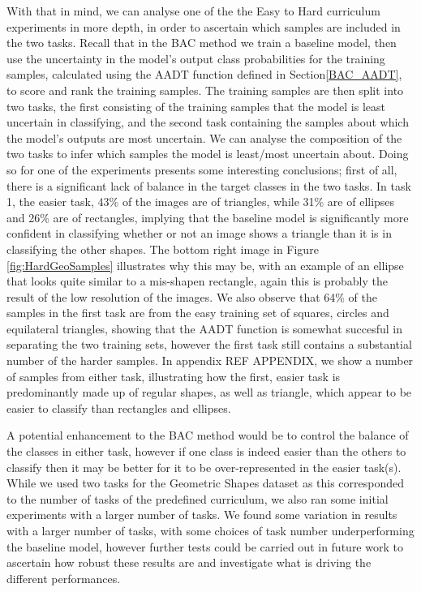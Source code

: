 With that in mind, we can analyse one of the the Easy to Hard curriculum experiments in more depth, in order to ascertain which samples are included in the two tasks. Recall that in the BAC method we train a baseline model, then use the uncertainty in the model's output class probabilities for the training samples, calculated using the AADT function defined in Section\ref{BAC_AADT}, to score and rank the training samples. The training samples are then split into two tasks, the first consisting of the training samples that the model is least uncertain in classifying, and the second task containing the samples about which the model's outputs are most uncertain. We can analyse the composition of the two tasks to infer which samples the model is least/most uncertain about. Doing so for one of the experiments presents some interesting conclusions; first of all, there is a significant lack of balance in the target classes in the two tasks. In task 1, the easier task, 43\% of the images are of triangles, while 31\% are of ellipses and 26\% are of rectangles, implying that the baseline model is significantly more confident in classifying whether or not an image shows a triangle than it is in classifying the other shapes. The bottom right image in Figure \ref{fig:HardGeoSamples} illustrates why this may be, with an example of an ellipse that looks quite similar to a mis-shapen rectangle, again this is probably the result of the low resolution of the images. We also observe that 64\% of the samples in the first task are from the easy training set of squares, circles and equilateral triangles, showing that the AADT function is somewhat succesful in separating the two training sets, however the first task still contains a substantial number of the harder samples. In appendix REF APPENDIX, we show a number of samples from either task, illustrating how the first, easier task is predominantly made up of regular shapes, as well as triangle, which appear to be easier to classify than rectangles and ellipses. 

A potential enhancement to the BAC method would be to control the balance of the classes in either task, however if one class is indeed easier than the others to classify then it may be better for it to be over-represented in the easier task(s). While we used two tasks for the Geometric Shapes dataset as this corresponded to the number of tasks of the predefined curriculum, we also ran some initial experiments with a larger number of tasks. We found some variation in results with a larger number of tasks, with some choices of task number underperforming the baseline model, however further tests could be carried out in future work to ascertain how robust these results are and investigate what is driving the different performances.
